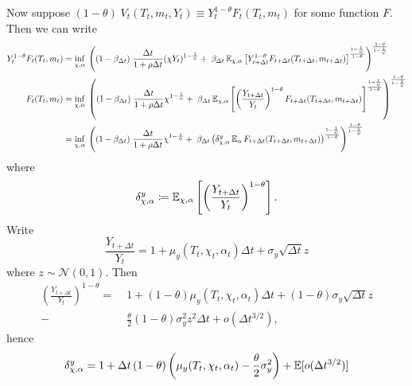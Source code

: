 \documentclass[../../main.tex]{subfiles}
\begin{document}
Now suppose $(1 - \theta) \; V_{t}(T_t, m_t, Y_t) \equiv Y_t^{1 - \theta} F_t(T_t, m_t)$ for some function $F$. Then we can write \begin{equation}
    \begin{split}
        Y_t^{1 - \theta} F_t(T_t, m_t) &= \inf_{\chi, \alpha} \; \left((1 - \beta_{\Delta t}) \; \frac{\Delta t}{1 + \rho \Delta t}  (\chi Y_t)^{1 - \frac{1}{\psi}}
        + \; \beta_{\Delta t}  \operatorname{\mathbb{E}}_{\chi, \alpha} \left[Y_{t + \Delta t}^{1 - \theta} F_{t + \Delta t}(T_{t + \Delta t}, m_{t + \Delta t})\right]^{\frac{1 - \frac{1}{\psi}}{1 - \theta}} \right)^{\frac{1 - \theta}{1 - \frac{1}{\psi}}} \\
        F_t(T_t, m_t) &= \inf_{\chi, \alpha} \; \left((1 - \beta_{\Delta t}) \; \frac{\Delta t}{1 + \rho \Delta t}  \chi^{1 - \frac{1}{\psi}}
        + \; \beta_{\Delta t}  \operatorname{\mathbb{E}}_{\chi, \alpha} \left[\left(\frac{Y_{t + \Delta t}}{Y_t}\right)^{1 - \theta} F_{t + \Delta t}(T_{t + \Delta t}, m_{t + \Delta t}) \right]^{\frac{1 - \frac{1}{\psi}}{1 - \theta}}  \right)^{\frac{1 - \theta}{1 - \frac{1}{\psi}}} \\
        &= \inf_{\chi, \alpha} \; \left((1 - \beta_{\Delta t}) \; \frac{\Delta t}{1 + \rho \Delta t}  \chi^{1 - \frac{1}{\psi}}
        + \; \beta_{\Delta t}  \left( \delta^y_{\chi, \alpha} \operatorname{\mathbb{E}}_{\alpha}F_{t + \Delta t}(T_{t + \Delta t}, m_{t + \Delta t}) \right)^{\frac{1 - \frac{1}{\psi}}{1 - \theta}}\right)^{\frac{1 - \theta}{1 - \frac{1}{\psi}}} 
    \end{split}
\end{equation} where \begin{equation}
    \delta^y_{\chi, \alpha} \coloneqq \operatorname{\mathbb{E}}_{\chi, \alpha} \left[ \left(\frac{Y_{t + \Delta t}}{Y_t}\right)^{1 - \theta} \right].
\end{equation} Write \begin{equation}
    \frac{Y_{t + \Delta t}}{Y_t} = 1 + \mu_y(T_t, \chi_t, \alpha_t) \Delta t + \sigma_y \sqrt{\Delta t} z
\end{equation} where $z\sim \mathcal{N}(0, 1)$. Then \begin{equation}
    \begin{split}
        \left(\frac{Y_{t + \Delta t}}{Y_t}\right)^{1 - \theta} = \; &1 + \left(1 - \theta\right) \mu_y(T_t, \chi_t, \alpha_t) \Delta t + \left(1 - \theta\right) \sigma_y \sqrt{\Delta t} z \\
        - &\frac{\theta}{2} \left(1 - \theta\right) \sigma_y^2 z^2 \Delta t + o(\Delta t^{3 / 2}),
    \end{split}
\end{equation} hence \begin{equation}
    \delta^y_{\chi, \alpha} = 1 + \Delta t \left(1 - \theta \right) \left(\mu_y(T_t, \chi_t, \alpha_t) - \frac{\theta}{2} \sigma_y^2 \right) + \operatorname{\mathbb{E}}[o(\Delta t^{3 / 2})]
\end{equation}
\end{document}
